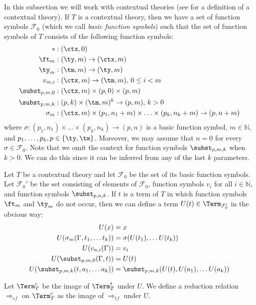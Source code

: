 In this subsection we will work with contextual theories (see \cite{alg-tt} for a definition of a contextual theory).
If $T$ is a contextual theory, then we have a set of function symbols $\mathcal{F}_0$ (which we call \emph{basic function symbols}) such that the set of function symbols of $T$ consists of the following function symbols:
\begin{align*}
* & : (\ctx,0) \\
\ft_m & : (\ty,m) \to (\ctx,m) \\
\ty_m & : (\tm,m) \to (\ty,m) \\
v_{m,i} & : (\ctx,m) \to (\tm,m) \text{, } 0 \leq i < m \\
\subst_{p,m,0} & : (\ctx,m) \times (p,0) \times (p,m) \\
\subst_{p,m,k} & : (p,k) \times (\tm,m)^k \to (p,m) \text{, } k > 0 \\
\sigma_m & : (\ctx,m) \times (p_1,n_1+m) \times \ldots \times (p_k,n_k+m) \to (p,n+m)
\end{align*}
where $\sigma : (p_1,n_1) \times \ldots \times (p_k,n_k) \to (p,n)$ is a basic function symbol, $m \in \mathbb{N}$, and $p_1, \ldots, p_k, p \in \{ \ty, \tm \}$.
Moreover, we may assume that $n = 0$ for every $\sigma \in \mathcal{F}_0$.
Note that we omit the context for function symbols $\subst_{p,m,k}$ when $k > 0$.
We can do this since it can be inferred from any of the last $k$ parameters.

Let $T$ be a contextual theory and let $\mathcal{F}_0$ be the set of its basic function symbols.
Let $\mathcal{F}_0'$ be the set consisting of elements of $\mathcal{F}_0$, function symbols $v_i$ for all $i \in \mathbb{N}$, and function symbols $\subst_{p,n,k}$.
If $t$ is a term of $T$ in which function symbols $\ft_m$ and $\ty_m$ do not occur, then we can define a term $U(t) \in \Term_{\mathcal{F}'_0}$ in the obvious way:
\begin{align*}
U(x) & = x \\
U(\sigma_m(\Gamma, t_1, \ldots t_k)) & = \sigma(U(t_1), \ldots U(t_k)) \\
U(v_{n,i}(\Gamma)) & = v_i \\
U(\subst_{p,m,0}(\Gamma,t)) & = U(t) \\
U(\subst_{p,m,k}(t, a_1, \ldots a_k)) & = \subst_{p,m,k}(U(t), U(a_1), \ldots U(a_k))
\end{align*}

Let $\Term_T^c$ be the image of $\Term_T^t$ under $U$.
We define a reduction relation $\Rightarrow_{cf}$ on $\Term_T^c$ as the image of $\Rightarrow_{tf}$ under $U$.

